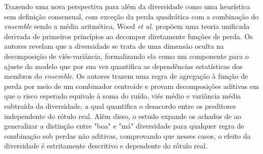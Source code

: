 Trazendo uma nova perspectiva para além da diversidade como uma heurística sem definição consensual, com exceção da perda quadrática com a combinação do \textit{ensemble} sendo a média aritmética, Wood \textit{et al.} \cite{woodUnifiedTheoryDiversity} propõem uma teoria unificada derivada de primeiros princípios ao decompor diretamente funções de perda. Os autores revelam que a diversidade se trata de uma dimensão oculta na decomposição de viés-variância, formalizando ela como um componente para o ajuste do modelo que por sua vez quantifica as dependências estatísticas dos membros do \textit{ensemble}. Os autores trazem uma regra de agregação à função de perda por meio de um combinador centroide e provam decomposições aditivas em que o risco esperado equivale à soma do ruído, viés médio e variância média subtraída da diversidade, a qual quantifica o desacordo entre os preditores independente do rótulo real. Além disso, o estudo expande os achados de \cite{didaciDiversityClassifierEnsembles2013} ao generalizar a distinção entre "boa" e "má" diversidade para qualquer regra de combinação sob perdas não aditivas, comprovando que nesses casos, o efeito da diversidade é estritamente descritivo e dependente do rótulo real.

